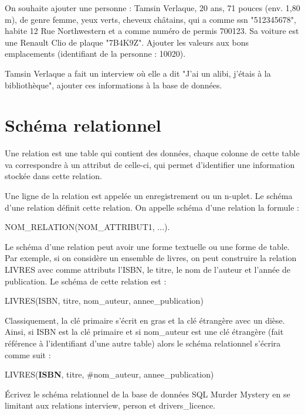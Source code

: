 \begin{Exercise}


    \Question On souhaite ajouter une personne : Tamsin Verlaque, 20 ans, 71 pouces (env. 1,80 m), de genre femme, yeux verts, cheveux châtains, qui a comme ssn "512345678", habite 12 Rue Northwestern et a comme numéro de permis 700123. Sa voiture est une Renault Clio de plaque "7B4K9Z".
    Ajouter les valeurs aux bons emplacements (identifiant de la personne : 10020).

\Question Tamsin Verlaque a fait un interview où elle a dit "J'ai un alibi, j'étais à la bibliothèque", ajouter ces informations à la base de données. 
\end{Exercise} 

\section{Schéma relationnel}
Une relation est une table qui contient des données, chaque colonne de cette table va correspondre à un attribut de celle-ci, qui permet d’identifier une information stockée dans cette relation.

Une ligne de la relation est appelée un enregistrement
ou un n-uplet. Le schéma d’une relation définit cette relation.
On appelle schéma d’une relation la formule :\\
\begin{center}
    NOM\_RELATION(NOM\_ATTRIBUT1, ...).\\
\end{center}


Le schéma d’une relation peut avoir une forme textuelle ou une forme de table. Par exemple, si on considère un ensemble de livres, on peut construire la relation LIVRES avec comme attributs l’ISBN, le titre, le nom de l’auteur et l’année de publication.
Le schéma de cette relation est :\\
\begin{center}
LIVRES(ISBN, titre, nom\_auteur, annee\_publication)\\
\end{center}

Classiquement, la clé primaire s'écrit en gras et la clé étrangère avec un dièse. Ainsi, si ISBN est la clé primaire et si nom\_auteur est une clé étrangère (fait référence à l'identifiant d'une autre table) alors le schéma relationnel s'écrira comme suit :\\
\begin{center}
LIVRES(\textbf{ISBN}, titre, \#nom\_auteur, annee\_publication)\\
\end{center}

Écrivez le schéma relationnel de la base de données SQL Murder Mystery en se limitant aux relations interview, person et drivers\_licence.\\

\emptybox{6cm}

\newpage


